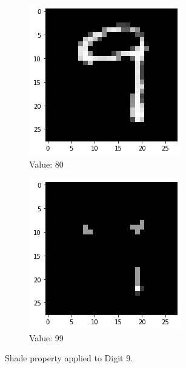 \begin{figure}[htb!]
\begin{subfigure}[b]{.3\textwidth}
            \includegraphics[width=\textwidth]{images/shade2.png}
            \caption{Value: 80}
            \label{fig:Rotate-misclass0}
        \end{subfigure}%
        \begin{subfigure}[b]{.3\textwidth}
            \centering
            \includegraphics[width=\linewidth]{images/shade3.png}
            \caption{Value: 99}
            \label{fig:Rotate-misclass0}
        \end{subfigure}
        
        \caption{Shade property applied to Digit 9.}
        \label{fig:Rotate-misclassifications}
    \end{figure}
    \FloatBarrier
    
